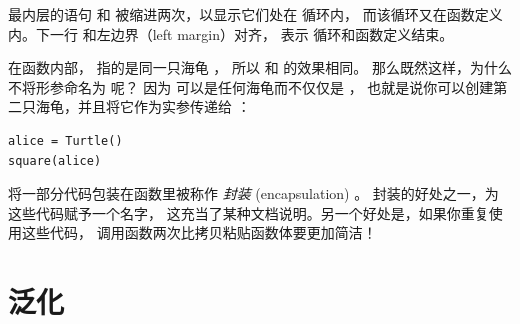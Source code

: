 
最内层的语句  和  被缩进两次，以显示它们处在  循环内， 而该循环又在函数定义内。下一行  和左边界（left margin）对齐， 表示  循环和函数定义结束。


在函数内部，  指的是同一只海龟  ， 所以  和  的效果相同。
那么既然这样，为什么不将形参命名为  呢？ 因为  可以是任何海龟而不仅仅是  ，
也就是说你可以创建第二只海龟，并且将它作为实参传递给  ：

\begin{lstlisting}
alice = Turtle()
square(alice)
\end{lstlisting}


将一部分代码包装在函数里被称作 \emph{封装} (encapsulation) 。
封装的好处之一，为这些代码赋予一个名字，
这充当了某种文档说明。另一个好处是，如果你重复使用这些代码，
调用函数两次比拷贝粘贴函数体要更加简洁！


\section{泛化}


